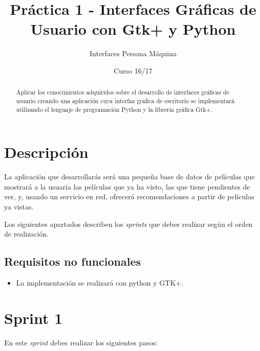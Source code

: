 \documentclass[11pt,a4paper]{article}
\title{Práctica 1 - Interfaces Gráficas de Usuario con Gtk+ y Python}
\author{Interfaces Persona Máquina}
\date{Curso 16/17}
\begin{document}
\maketitle

\begin{abstract}
  Aplicar los conocimientos adquiridos sobre el desarrollo de
  interfaces gráficas de usuario creando una aplicación cuya interfaz
  gráfica de escritorio se implementará utilizando el lenguaje de
  programación Python y la librería gráfica Gtk+.
\end{abstract}


\section{Descripción}

La aplicación que desarrollarás será una pequeña base de datos de películas
que mostrará a la usuaria las películas que ya ha visto, las que tiene
pendientes de ver, y, usando un servicio en red, ofrecerá recomendaciones
a partir de películas ya vistas.

Los siguientes apartados describen los \emph{sprints} que debes
realizar según el orden de realización.


\subsection{Requisitos no funcionales}
\begin{itemize}
\item La implementación se realizará con python y GTK+.
\end{itemize}


\section{Sprint 1}

En este \emph{sprint} debes realizar los siguientes pasos:
\end{document}
